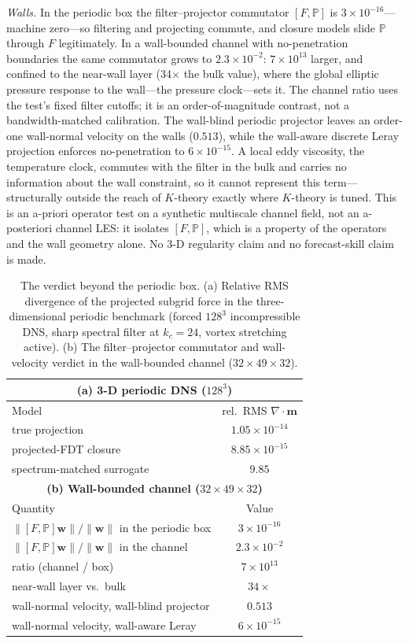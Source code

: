 \documentclass[11pt]{article}
\begin{document}
\emph{Walls.} In the periodic box the filter--projector commutator $[F,\mathbb{P}]$ is $3\times10^{-16}$---machine zero---so filtering and projecting commute, and closure models slide $\mathbb{P}$ through $F$ legitimately. In a wall-bounded channel with no-penetration boundaries the same commutator grows to $2.3\times10^{-2}$: $7\times10^{13}$ larger, and confined to the near-wall layer (34$\times$ the bulk value), where the global elliptic pressure response to the wall---the pressure clock---sets it. The channel ratio uses the test's fixed filter cutoffs; it is an order-of-magnitude contrast, not a bandwidth-matched calibration. The wall-blind periodic projector leaves an order-one wall-normal velocity on the walls ($0.513$), while the wall-aware discrete Leray projection enforces no-penetration to $6\times10^{-15}$. A local eddy viscosity, the temperature clock, commutes with the filter in the bulk and carries no information about the wall constraint, so it cannot represent this term---structurally outside the reach of $K$-theory exactly where $K$-theory is tuned. This is an a-priori operator test on a synthetic multiscale channel field, not an a-posteriori channel LES: it isolates $[F,\mathbb{P}]$, which is a property of the operators and the wall geometry alone. No 3-D regularity claim and no forecast-skill claim is made.

\begin{table}[h]
\centering
\small
\caption{The verdict beyond the periodic box. (a) Relative RMS divergence of the projected subgrid force in the three-dimensional periodic benchmark (forced $128^3$ incompressible DNS, sharp spectral filter at $k_c=24$, vortex stretching active). (b) The filter--projector commutator and wall-velocity verdict in the wall-bounded channel ($32\times49\times32$).}
\label{tab:beyond}
\begin{tabular}{@{}lc@{}}
\toprule
\multicolumn{2}{c}{\textbf{(a) 3-D periodic DNS ($128^3$)}} \\
\midrule
Model & rel.\ RMS $\nabla\!\cdot\!\mathbf{m}$ \\
\midrule
true projection & $1.05\times10^{-14}$ \\
projected-FDT closure & $8.85\times10^{-15}$ \\
spectrum-matched surrogate & $9.85$ \\
\midrule
\multicolumn{2}{c}{\textbf{(b) Wall-bounded channel ($32\times49\times32$)}} \\
\midrule
Quantity & Value \\
\midrule
$\|[F,\mathbb{P}]\mathbf{w}\|/\|\mathbf{w}\|$ in the periodic box & $3\times10^{-16}$ \\
$\|[F,\mathbb{P}]\mathbf{w}\|/\|\mathbf{w}\|$ in the channel & $2.3\times10^{-2}$ \\
ratio (channel / box) & $7\times10^{13}$ \\
near-wall layer vs.\ bulk & $34\times$ \\
wall-normal velocity, wall-blind projector & $0.513$ \\
wall-normal velocity, wall-aware Leray & $6\times10^{-15}$ \\
\bottomrule
\end{tabular}
\end{table}
\end{document}
